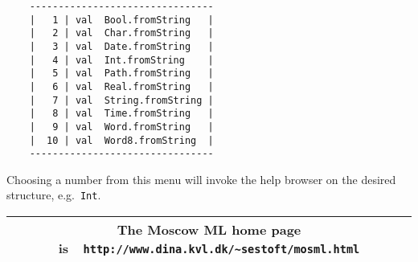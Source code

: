 \documentclass[fleqn,twoside]{article}
\begin{document}
{\small\begin{verbatim}
    --------------------------------
    |   1 | val  Bool.fromString   |
    |   2 | val  Char.fromString   |
    |   3 | val  Date.fromString   |
    |   4 | val  Int.fromString    |
    |   5 | val  Path.fromString   |
    |   6 | val  Real.fromString   |
    |   7 | val  String.fromString |
    |   8 | val  Time.fromString   |
    |   9 | val  Word.fromString   |
    |  10 | val  Word8.fromString  |
    --------------------------------
\end{verbatim}}

\noindent Choosing a number from this menu will invoke the help
browser on the desired structure, e.g.\ {\tt Int}.  

\vfill

\begin{center}
\begin{tabular}{|c|}\hline
\rule[-0.4cm]{0cm}{1cm}The Moscow ML home page is\ \
    \verb$http://www.dina.kvl.dk/~sestoft/mosml.html$\\\hline
\end{tabular}
\end{center}

\newpage

\setcounter{page}{1}

\twocolumn
{\setlength{\parindent}{0cm}
\renewcommand{\contentsline}[3]{#2\hfill #3\hspace*{3em}\newline}
\tableofcontents
}
\onecolumn

\newpage 



\newpage
{}

\end{document}
